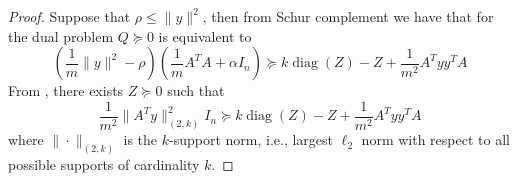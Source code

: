 \documentclass[11pt]{amsart}
\theoremstyle{plain}
\theoremstyle{definition}
\theoremstyle{remark}
\DeclareMathOperator{\diag}{diag}
\begin{document}
	\begin{proof}
		Suppose that $\rho \leq \|y\|^2$, then from Schur complement we have that for the dual problem $Q \succeq 0$ is equivalent to 
		\begin{equation}\label{eq:slr_schur}
			(\frac{1}{m}\|y\|^2 - \rho) (\frac{1}{m}A^TA+ \alpha I_n) \succeq k\diag(Z) - Z  + \frac{1}{m^2}A^Tyy^T A 
		\end{equation}
		From , there exists $Z\succeq 0$ such that
		\begin{equation}\label{eq:slr_lem}
			\frac{1}{m^2}\|A^Ty\|^2_{(2,k)} I_n \succeq k\diag(Z) - Z  + \frac{1}{m^2}A^Tyy^T A 
		\end{equation}
		where $ \|\cdot \|_{(2,k)}$ is the $k$-support norm, i.e., largest $\ell_2$ norm with respect to all possible supports of cardinality $k$. 
        

\end{proof}
\end{document}
